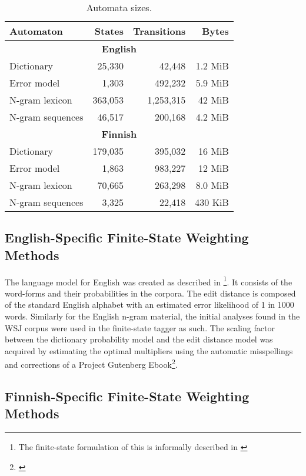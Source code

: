 \documentclass{llncs}
\begin{document}
\begin{table}
\caption{Automata sizes\label{table:sizes}.}
\begin{center}
\begin{tabular}{lrrr}
    Automaton & States & Transitions & Bytes \\
    \hline
    \multicolumn{4}{c}{\textbf{English}} \\
    \hline
    Dictionary & 25,330 & 42,448 & 1.2 MiB \\
    Error model & 1,303 & 492,232 & 5.9 MiB \\
    N-gram lexicon & 363,053 & 1,253,315 & 42 MiB \\
    N-gram sequences & 46,517 & 200,168 & 4.2 MiB \\
    \hline
    \multicolumn{4}{c}{\textbf{Finnish}} \\
    \hline
    Dictionary & 179,035 & 395,032 & 16 MiB \\
    Error model & 1,863 & 983,227 & 12 MiB \\
    N-gram lexicon & 70,665 & 263,298 & 8.0 MiB \\
    N-gram sequences & 3,325 & 22,418 & 430 KiB \\
    \hline
\end{tabular}
\end{center}
\end{table}

\subsection{English-Specific Finite-State Weighting Methods}

The language model for English was created as described in
\cite{norvig/2010}\footnote{The finite-state formulation of this is informally
described in \url{}}.  It consists of the word-forms and their  probabilities in the
corpora. The edit distance is composed of the standard English alphabet with
an estimated error likelihood of 1 in 1000 words.  Similarly for the English n-gram
material, the initial analyses found in the WSJ corpus were used in the
finite-state tagger as such. The scaling factor between the dictionary probability model and
the edit distance model was acquired by estimating the optimal multipliers using the automatic
misspellings and corrections of a Project Gutenberg Ebook\footnote{\url{}}.

\subsection{Finnish-Specific Finite-State Weighting Methods}
\end{document}

